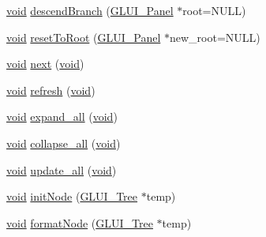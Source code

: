 \begin{DoxyCompactItemize}
\item 
\hyperlink{wglext_8h_a9e6b7f1933461ef318bb000d6bd13b83}{void} \hyperlink{class_g_l_u_i___tree_panel_a2db40b406b533cbb37a815ec6b40b9d9}{descend\+Branch} (\hyperlink{class_g_l_u_i___panel}{G\+L\+U\+I\+\_\+\+Panel} $\ast$root=N\+U\+L\+L)
\item 
\hyperlink{wglext_8h_a9e6b7f1933461ef318bb000d6bd13b83}{void} \hyperlink{class_g_l_u_i___tree_panel_afb0e79d1dc91dc54a68b1a8713b8c304}{reset\+To\+Root} (\hyperlink{class_g_l_u_i___panel}{G\+L\+U\+I\+\_\+\+Panel} $\ast$new\+\_\+root=N\+U\+L\+L)
\item 
\hyperlink{wglext_8h_a9e6b7f1933461ef318bb000d6bd13b83}{void} \hyperlink{class_g_l_u_i___tree_panel_a1f7f1fbf6bc2981fcbc6e18d411282ec}{next} (\hyperlink{wglext_8h_a9e6b7f1933461ef318bb000d6bd13b83}{void})
\item 
\hyperlink{wglext_8h_a9e6b7f1933461ef318bb000d6bd13b83}{void} \hyperlink{class_g_l_u_i___tree_panel_a2ee78d8dc12158d0a238352b64fc8c40}{refresh} (\hyperlink{wglext_8h_a9e6b7f1933461ef318bb000d6bd13b83}{void})
\item 
\hyperlink{wglext_8h_a9e6b7f1933461ef318bb000d6bd13b83}{void} \hyperlink{class_g_l_u_i___tree_panel_a8d49fb5df0741d2e5f00e90312f8c485}{expand\+\_\+all} (\hyperlink{wglext_8h_a9e6b7f1933461ef318bb000d6bd13b83}{void})
\item 
\hyperlink{wglext_8h_a9e6b7f1933461ef318bb000d6bd13b83}{void} \hyperlink{class_g_l_u_i___tree_panel_aa0734d6f9d1ffb0b936207862931b369}{collapse\+\_\+all} (\hyperlink{wglext_8h_a9e6b7f1933461ef318bb000d6bd13b83}{void})
\item 
\hyperlink{wglext_8h_a9e6b7f1933461ef318bb000d6bd13b83}{void} \hyperlink{class_g_l_u_i___tree_panel_ad47d4b3fc3126d22de92a69f1acfdbc0}{update\+\_\+all} (\hyperlink{wglext_8h_a9e6b7f1933461ef318bb000d6bd13b83}{void})
\item 
\hyperlink{wglext_8h_a9e6b7f1933461ef318bb000d6bd13b83}{void} \hyperlink{class_g_l_u_i___tree_panel_acad3e81a379af8d21c03b142e383d25e}{init\+Node} (\hyperlink{class_g_l_u_i___tree}{G\+L\+U\+I\+\_\+\+Tree} $\ast$temp)
\item 
\hyperlink{wglext_8h_a9e6b7f1933461ef318bb000d6bd13b83}{void} \hyperlink{class_g_l_u_i___tree_panel_abb0fcb52726f6253858721959cd3279a}{format\+Node} (\hyperlink{class_g_l_u_i___tree}{G\+L\+U\+I\+\_\+\+Tree} $\ast$temp)
\end{DoxyCompactItemize}
